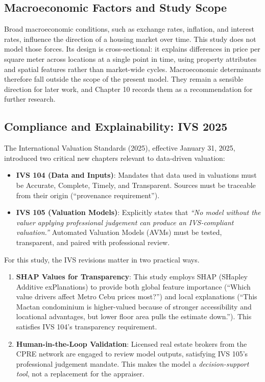 \subsection{Macroeconomic Factors and Study Scope}\label{macroeconomic-factors-and-study-scope}

Broad macroeconomic conditions, such as exchange rates, inflation, and interest rates, influence the direction of a housing market over time. This study does not model those forces. Its design is cross-sectional: it explains differences in price per square meter across locations at a single point in time, using property attributes and spatial features rather than market-wide cycles. Macroeconomic determinants therefore fall outside the scope of the present model. They remain a sensible direction for later work, and Chapter 10 records them as a recommendation for further research.


\subsection{Compliance and Explainability: IVS 2025}\label{compliance-and-explainability-ivs-2025}

The International Valuation Standards (2025), effective January 31, 2025, introduced two critical new chapters relevant to data-driven valuation:

\begingroup\setlength{\topsep}{0pt}\setlength{\partopsep}{0pt}
\begin{itemize}
\item \textbf{IVS 104 (Data and Inputs)}: Mandates that data used in valuations must be Accurate, Complete, Timely, and Transparent. Sources must be traceable from their origin (``provenance requirement'').
\item \textbf{IVS 105 (Valuation Models)}: Explicitly states that \emph{``No model without the valuer applying professional judgement can produce an IVS-compliant valuation.''} Automated Valuation Models (AVMs) must be tested, transparent, and paired with professional review.
\end{itemize}
\endgroup

For this study, the IVS revisions matter in two practical ways.

\begin{enumerate}
\item \textbf{SHAP Values for Transparency}: This study employs SHAP (SHapley Additive exPlanations) to provide both global feature importance (``Which value drivers affect Metro Cebu prices most?'') and local explanations (``This Mactan condominium is higher-valued because of stronger accessibility and locational advantages, but lower floor area pulls the estimate down.''). This satisfies IVS 104's transparency requirement.
\item \textbf{Human-in-the-Loop Validation}: Licensed real estate brokers from the CPRE network are engaged to review model outputs, satisfying IVS 105's professional judgement mandate. This makes the model a \emph{decision-support tool}, not a replacement for the appraiser.
\end{enumerate}


